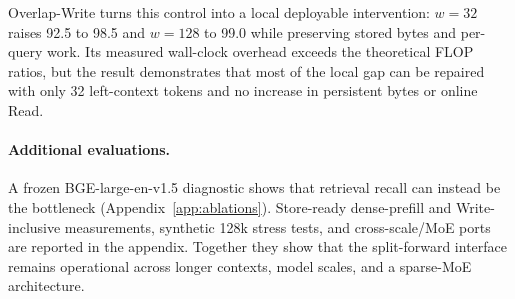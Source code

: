 Overlap-Write turns this control into a local deployable intervention:
$w{=}32$ raises 92.5 to 98.5 and $w{=}128$ to 99.0 while preserving stored
bytes and per-query work. Its measured wall-clock overhead exceeds the theoretical FLOP ratios, but the
result demonstrates that most of the local gap can be repaired with only 32
left-context tokens and no increase in persistent bytes or online Read.

\paragraph{Additional evaluations.}
A frozen BGE-large-en-v1.5 diagnostic shows that retrieval recall can instead be
the bottleneck (Appendix~\ref{app:ablations}). Store-ready dense-prefill and
Write-inclusive measurements, synthetic 128k stress tests, and cross-scale/MoE
ports are reported in the appendix. Together they show that the split-forward interface remains operational across
longer contexts, model scales, and a sparse-MoE architecture.
